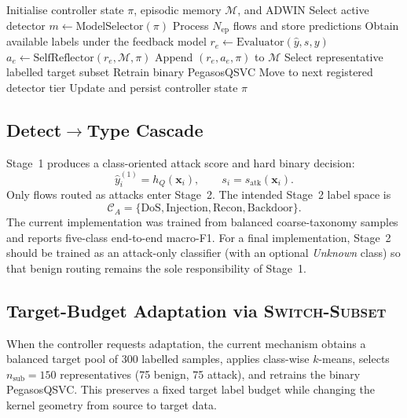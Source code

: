 \documentclass[conference]{IEEEtran}
\begin{document}
\begin{algorithm}[t]
\caption{Q-Armor Reflexive Episodic Control}
\label{alg:reflexion}
\begin{algorithmic}[1]
\STATE Initialise controller state $\pi$, episodic memory $\mathcal{M}$, and ADWIN
\STATE Select active detector $m \leftarrow \text{ModelSelector}(\pi)$
\STATE Process $N_{\text{ep}}$ flows and store predictions
\STATE Obtain available labels under the feedback model
\STATE $r_e \leftarrow \text{Evaluator}(\hat{y}, s, y)$
\STATE $a_e \leftarrow \text{SelfReflector}(r_e, \mathcal{M}, \pi)$
\STATE Append $(r_e, a_e, \pi)$ to $\mathcal{M}$
\STATE Select representative labelled target subset
\STATE Retrain binary PegasosQSVC
\STATE Move to next registered detector tier
\ENDIF
\STATE Update and persist controller state $\pi$
\ENDFOR
\end{algorithmic}
\end{algorithm}

\subsection{Detect$\to$Type Cascade}
\label{subsec:cascade}

Stage~1 produces a class-oriented attack score and hard binary decision:
\begin{equation}
\hat{y}_i^{(1)} = h_Q(\mathbf{x}_i), \qquad s_i = s_{\text{atk}}(\mathbf{x}_i).
\label{eq:stage1}
\end{equation}
Only flows routed as attacks enter Stage~2. The intended Stage~2 label
space is
\begin{equation}
\mathcal{C}_A = \{\text{DoS}, \text{Injection}, \text{Recon},
\text{Backdoor}\}.
\label{eq:stage2space}
\end{equation}
The current implementation was trained from balanced coarse-taxonomy
samples and reports five-class end-to-end macro-F1. For a final
implementation, Stage~2 should be trained as an attack-only classifier
(with an optional \emph{Unknown} class) so that benign routing remains the
sole responsibility of Stage~1.

\subsection{Target-Budget Adaptation via \textsc{Switch-Subset}}

When the controller requests adaptation, the current mechanism obtains a
balanced target pool of 300 labelled samples, applies class-wise
$k$-means, selects $n_{\text{sub}}=150$ representatives (75 benign, 75
attack), and retrains the binary PegasosQSVC. This preserves a fixed
target label budget while changing the kernel geometry from source to
target data.
\end{document}
